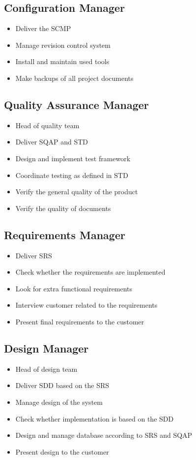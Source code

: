 \documentclass[a4paper, 12pt]{report}
\begin{document}
		\subsection{Configuration Manager}
			\begin{itemize}
				\item Deliver the SCMP
				\item Manage revision control system
				\item Install and maintain used tools
				\item Make backups of all project documents
			\end{itemize}
			
		\subsection{Quality Assurance Manager}
			\begin{itemize}
					\item Head of quality team
					\item Deliver SQAP and STD
					\item Design and implement test framework
					\item Coordinate testing as defined in STD
					\item Verify the general quality of the product
					\item Verify the quality of documents
			\end{itemize}
			
		\subsection{Requirements Manager}
			\begin{itemize}
				\item Deliver SRS
				\item Check whether the requirements are implemented
				\item Look for extra functional requirements
				\item Interview customer related to the requirements
				\item Present final requirements to the customer
			\end{itemize}
			
		\subsection{Design Manager}	
			\begin{itemize}
				\item Head of design team
				\item Deliver SDD based on the SRS
				\item Manage design of the system
				\item Check whether implementation is based on the SDD
				\item Design and manage database according to SRS and SQAP
				\item Present design to the customer
			\end{itemize}	
			
\end{document}
